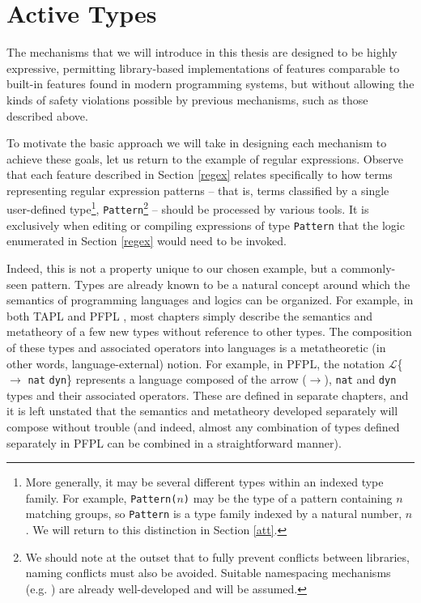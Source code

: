 \section{Active Types}\label{contributions}
The mechanisms that we will introduce in this thesis are designed to be highly {expressive}, permitting library-based implementations of features comparable to built-in features found in modern programming systems, but without allowing the kinds of {safety} violations possible by previous mechanisms, such as those described above. %

To motivate the basic approach we will take in designing each mechanism to achieve these goals, let us return to the example of regular expressions. Observe that each feature described in Section \ref{regex} relates specifically to how terms representing regular expression patterns -- that is, terms classified by a single user-defined type\footnote{More generally, it may be several different types within an indexed type family. For example, \texttt{Pattern(}$n$\texttt{)}  may be the type of a pattern containing $n$ matching groups, so \texttt{Pattern} is  a type family indexed by a natural number, $n$ \cite{regex-type-system}. We will return to this distinction in Section \ref{att}.}, \verb|Pattern|\footnote{We should note at the outset that to fully prevent conflicts between libraries, naming conflicts must also be avoided. Suitable namespacing mechanisms (e.g. \cite{namespacing}) are already well-developed and will be assumed.} -- should be processed by various tools.  It is exclusively when editing or compiling expressions of type \verb|Pattern| that the logic enumerated in Section \ref{regex} would need to be invoked. 

Indeed, this is not a property unique to our chosen example, but a commonly-seen pattern. Types are already known to be a natural concept around which the semantics of programming languages and logics can be organized. For example, in both TAPL \cite{tapl} and PFPL \cite{pfpl}, most chapters simply describe the semantics and metatheory of a few new types without reference to other types. The composition of these types and associated operators into languages is a metatheoretic (in other words, language-external) notion. For example, in PFPL, the notation $\mathcal{L}$\{$\rightarrow$ \verb|nat| \verb|dyn|\} represents a language composed of the arrow ($\rightarrow$), \verb|nat| and \verb|dyn| types and their associated operators. These are defined in separate chapters, and it is  left unstated that the semantics and metatheory developed separately will compose without trouble (and indeed, almost any combination of types defined separately in PFPL can be combined in a straightforward manner). 

